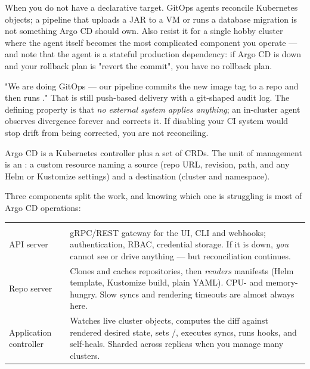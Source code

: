  When you do not have a declarative target. GitOps agents reconcile Kubernetes objects; a pipeline that uploads a JAR to a VM or runs a database migration is not something Argo CD should own. Also resist it for a single hobby cluster where the agent itself becomes the most complicated component you operate --- and note that the agent is a stateful production dependency: if Argo CD is down and your rollback plan is "revert the commit", you have no rollback plan.

\begin{misconception}
"We are doing GitOps --- our pipeline commits the new image tag to a repo and then runs ." That is still push-based delivery with a git-shaped audit log. The defining property is that \emph{no external system applies anything}; an in-cluster agent observes divergence forever and corrects it. If disabling your CI system would stop drift from being corrected, you are not reconciling.
\end{misconception}


 Argo CD is a Kubernetes controller plus a set of CRDs. The unit of management is an : a custom resource naming a source (repo URL, revision, path, and any Helm or Kustomize settings) and a destination (cluster and namespace).

 Three components split the work, and knowing which one is struggling is most of Argo CD operations:

\begin{center}\small
\wbrowcolors
\begin{tabularx}{\linewidth}{@{}L{27mm} X@{}}
 & \\
API server & gRPC/REST gateway for the UI, CLI and webhooks; authentication, RBAC, credential storage. If it is down, \emph{you} cannot see or drive anything --- but reconciliation continues.\\
Repo server & Clones and caches repositories, then \emph{renders} manifests (Helm template, Kustomize build, plain YAML). CPU- and memory-hungry. Slow syncs and rendering timeouts are almost always here.\\
Application controller & Watches live cluster objects, computes the diff against rendered desired state, sets /, executes syncs, runs hooks, and self-heals. Sharded across replicas when you manage many clusters.\\
\end{tabularx}
\end{center}

